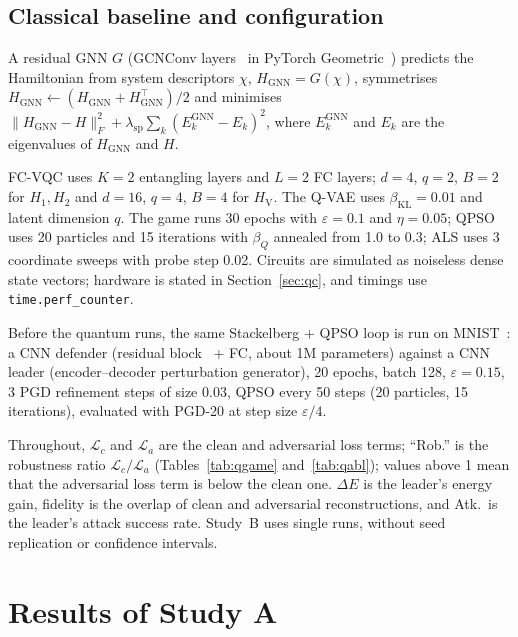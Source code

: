 \documentclass[conference]{IEEEtran}
\newcommand{\cL}{\mathcal{L}}
\newcommand{\HV}{H_{\mathrm{V}}}
\begin{document}
\subsection{Classical baseline and configuration}
A residual GNN $G$ (GCNConv layers~\cite{kipf2017} in PyTorch Geometric~\cite{fey2019}) predicts the Hamiltonian from system descriptors $\chi$, $H_{\mathrm{GNN}}=G(\chi)$, symmetrises $H_{\mathrm{GNN}}\leftarrow(H_{\mathrm{GNN}}+H_{\mathrm{GNN}}^\top)/2$ and minimises $\|H_{\mathrm{GNN}}-H\|_F^2+\lambda_{\mathrm{sp}}\sum_k(E^{\mathrm{GNN}}_k-E_k)^2$, where $E^{\mathrm{GNN}}_k$ and $E_k$ are the eigenvalues of $H_{\mathrm{GNN}}$ and $H$.

FC-VQC uses $K{=}2$ entangling layers and $L{=}2$ FC layers; $d{=}4$, $q{=}2$, $B{=}2$ for $H_1,H_2$ and $d{=}16$, $q{=}4$, $B{=}4$ for $\HV$. The Q-VAE uses $\beta_{\mathrm{KL}}{=}0.01$ and latent dimension $q$. The game runs 30 epochs with $\varepsilon{=}0.1$ and $\eta{=}0.05$; QPSO uses 20 particles and 15 iterations with $\beta_Q$ annealed from 1.0 to 0.3; ALS uses 3 coordinate sweeps with probe step 0.02. Circuits are simulated as noiseless dense state vectors; hardware is stated in Section~\ref{sec:qc}, and timings use \texttt{time.perf\_counter}.

Before the quantum runs, the same Stackelberg + QPSO loop is run on MNIST~\cite{lecun1998}: a CNN defender (residual block~\cite{he2016} + FC, about 1M parameters) against a CNN leader (encoder--decoder perturbation generator), 20 epochs, batch 128, $\varepsilon{=}0.15$, 3 PGD refinement steps of size 0.03, QPSO every 50 steps (20 particles, 15 iterations), evaluated with PGD-20 at step size $\varepsilon/4$.

Throughout, $\cL_c$ and $\cL_a$ are the clean and adversarial loss terms; ``Rob.'' is the robustness ratio $\cL_c/\cL_a$ (Tables~\ref{tab:qgame} and~\ref{tab:qabl}); values above 1 mean that the adversarial loss term is below the clean one. $\Delta E$ is the leader's energy gain, fidelity is the overlap of clean and adversarial reconstructions, and Atk.\ is the leader's attack success rate. Study~B uses single runs, without seed replication or confidence intervals.

\section{Results of Study A}\label{sec:resA}
\end{document}
